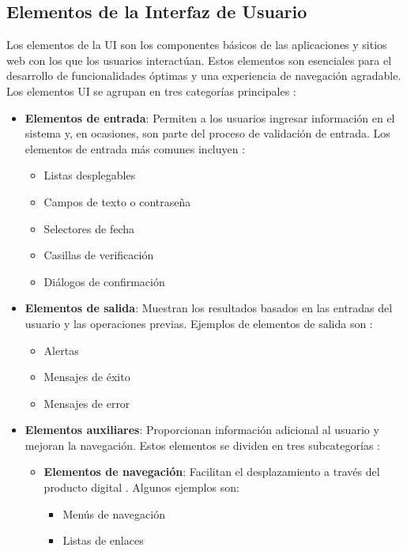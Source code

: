 \subsection{Elementos de la Interfaz de Usuario}
Los elementos de la UI son los componentes básicos de las aplicaciones y sitios web con los que los usuarios interactúan. Estos elementos son esenciales para el desarrollo de funcionalidades óptimas y una experiencia de navegación agradable. Los elementos UI se agrupan en tres categorías principales \cite{OrtegaSF}:

\begin{itemize}
    \item \textbf{Elementos de entrada}: Permiten a los usuarios ingresar información en el sistema y, en ocasiones, son parte del proceso de validación de entrada. Los elementos de entrada más comunes incluyen \cite{OrtegaSF}:
    \begin{itemize}
        \item Listas desplegables
        \item Campos de texto o contraseña
        \item Selectores de fecha
        \item Casillas de verificación
        \item Diálogos de confirmación
    \end{itemize}
    \item \textbf{Elementos de salida}: Muestran los resultados basados en las entradas del usuario y las operaciones previas. Ejemplos de elementos de salida son \cite{OrtegaSF}:
    \begin{itemize}
        \item Alertas
        \item Mensajes de éxito
        \item Mensajes de error
    \end{itemize}
    \item \textbf{Elementos auxiliares}: Proporcionan información adicional al usuario y mejoran la navegación. Estos elementos se dividen en tres subcategorías \cite{OrtegaSF}:
    \begin{itemize}
        \item \textbf{Elementos de navegación}: Facilitan el desplazamiento a través del producto digital \cite{OrtegaSF}. Algunos ejemplos son:
        \begin{itemize}
            \item Menús de navegación
            \item Listas de enlaces

\end{itemize}
\end{itemize}
\end{itemize}
